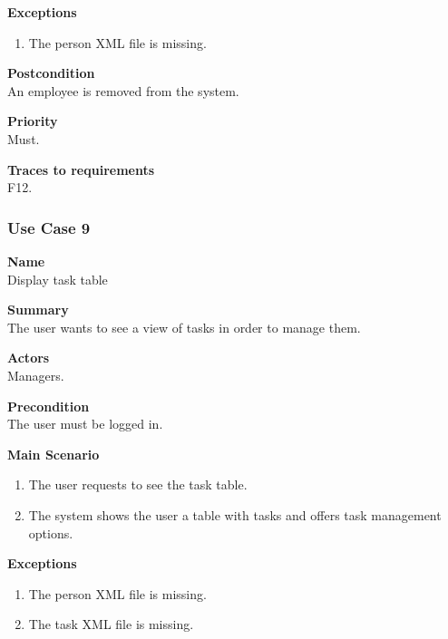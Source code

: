 \documentclass[12pt]{article}
\begin{document}
\noindent
{\bf Exceptions}\\
\vspace*{-0.35in}
\begin{enumerate}
\item The person XML file is missing.
\end{enumerate}
\vspace*{-0.1in}

\noindent
{\bf Postcondition}\\
An  employee is removed from the system.

\noindent
{\bf Priority}\\
Must.

\noindent
{\bf Traces to requirements}\\
F12.

\subsubsection{Use Case 9} \label{uc:9}

\noindent
{\bf Name}\\
Display task table

\noindent
{\bf Summary}\\
The user wants to see a view of tasks in order to manage them.

\noindent
{\bf Actors}\\
Managers.

\noindent
{\bf Precondition}\\
The user must be logged in.

\noindent
{\bf Main Scenario}\\
\vspace*{-0.35in}
\begin{enumerate}
\item The user requests to see the task table.
\vspace*{-0.1in}
\item The system shows the user a table with tasks and offers task management options.
\end{enumerate}
\vspace*{-0.1in}

\noindent
{\bf Exceptions}\\
\vspace*{-0.35in}
\begin{enumerate}
\item The person XML file is missing.
\vspace*{-0.1in}
\item The task XML file is missing.
\end{enumerate}
\vspace*{-0.1in}
\end{document}

